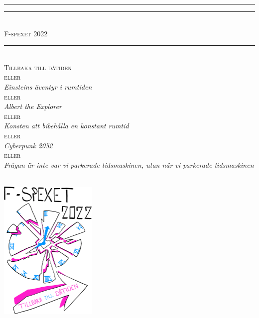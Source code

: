 \begin{center}

\rule{\textwidth}{1pt}
\rule{\textwidth-1cm}{0.4pt}\\
\vspace{0.3cm}
\textsc{\HUGE F-spexet 2022}\\
\rule{0.3\textwidth}{0.4pt}\\
\vspace{0.025\textheight}
\textsc{\HUGE Tillbaka till dåtiden}\\
\vspace{0.2cm}
\textsc{\large eller}\\
\vspace{0.005\textheight}
\textit{\LARGE Einsteins äventyr i rumtiden}\\
\vspace{0.010\textheight}
\textsc{\normalsize eller}\\
\vspace{0.005\textheight}
\textit{\Large Albert the Explorer}\\
\vspace{0.0075\textheight}
\textsc{\small eller}\\
\vspace{0.0025\textheight}
\textit{\large Konsten att bibehålla en konstant rumtid}\\
\vspace{0.005\textheight}
\textsc{\footnotesize eller}\\
\textit{\normalsize Cyberpunk 2052}\\
\vspace{0.0025\textheight}
\textsc{\tiny eller}\\
\textit{\small Frågan är inte \emph{var} vi parkerade tidsmaskinen, utan \emph{när} vi parkerade tidsmaskinen}\\
\hrulefill\\
\vspace{\fill}
\parbox[c][][c]{0.45\textwidth}{\centering \includegraphics[width=0.35\textwidth]{Bilder/TidigareSpexloggor/2022Datiden.png}}

\end{center}
